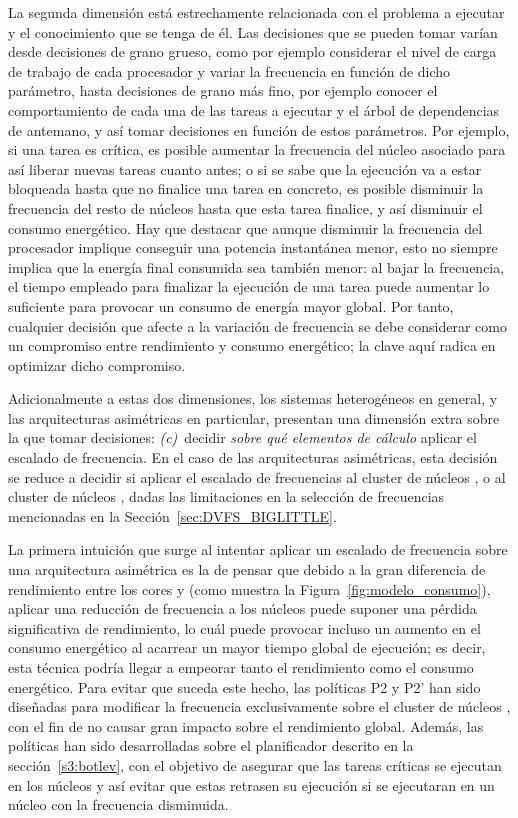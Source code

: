 La segunda dimensión está estrechamente relacionada con el problema a
ejecutar y el conocimiento que se tenga de él. Las decisiones que se pueden
tomar varían desde decisiones de grano grueso, como por ejemplo considerar 
el nivel de carga de trabajo de cada procesador y variar la frecuencia en
función de dicho parámetro, hasta decisiones de grano más fino, por ejemplo 
conocer el comportamiento de cada una de las tareas a ejecutar y el árbol
de dependencias de antemano, y así tomar decisiones en función de estos
parámetros. Por ejemplo, si una tarea es crítica, es posible aumentar la
frecuencia del núcleo asociado para así liberar nuevas tareas cuanto antes; o si se
sabe que la ejecución va a estar bloqueada hasta que no finalice una tarea
en concreto, es posible disminuir la frecuencia del resto de núcleos hasta que
esta tarea finalice, y así disminuir el consumo energético. Hay que
destacar que aunque disminuir la frecuencia del procesador implique conseguir
una potencia instantánea menor, esto no siempre implica que la energía final
consumida sea también menor: al bajar la frecuencia, el tiempo
empleado para finalizar la ejecución de una tarea puede aumentar lo
suficiente para provocar un consumo de energía mayor global. Por tanto,
cualquier decisión que afecte a la variación de frecuencia se debe considerar
como un compromiso entre rendimiento y consumo energético; la clave aquí radica
en optimizar dicho compromiso.

Adicionalmente a estas dos dimensiones, los sistemas heterogéneos en general, y
las arquitecturas asimétricas en particular, presentan una dimensión extra sobre
la que tomar decisiones: {\em (c)}~decidir {\em sobre qué elementos de cálculo} aplicar
el escalado de frecuencia. En el caso de las arquitecturas asimétricas,
esta decisión se reduce a decidir si aplicar el escalado de frecuencias
al cluster de núcleos \BIG, o al cluster de núcleos \LITTLE, dadas las limitaciones
en la selección de frecuencias mencionadas en la Sección~\ref{sec:DVFS_BIGLITTLE}.

La primera intuición que surge al intentar aplicar un escalado de
frecuencia sobre una arquitectura asimétrica es la de pensar que debido a
la gran diferencia de rendimiento entre los cores \BIG y \LITTLE (como 
muestra la Figura~\ref{fig:modelo_consumo}), aplicar una reducción de frecuencia a
los núcleos \BIG puede suponer una pérdida significativa de rendimiento, lo
cuál puede provocar incluso un aumento en el consumo energético al acarrear
un mayor tiempo global de ejecución; es decir, esta técnica podría llegar a
empeorar tanto el rendimiento como el consumo energético. Para evitar que
suceda este hecho, las políticas P2 y P2' han sido diseñadas para modificar
la frecuencia exclusivamente sobre el cluster de núcleos \LITTLE, con el fin de no causar
gran impacto sobre el rendimiento global. Además, las políticas han sido
desarrolladas sobre el planificador \botlev descrito en la
sección~\ref{s3:botlev}, con el objetivo de asegurar que las
tareas críticas se ejecutan en los núcleos \BIG y así evitar que estas
retrasen su ejecución si se ejecutaran en un núcleo \LITTLE con la frecuencia
disminuida.

